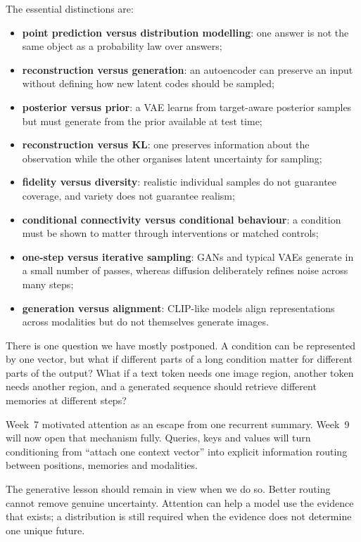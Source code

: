 The essential distinctions are:
\begin{itemize}[leftmargin=*]
  \item \textbf{point prediction versus distribution modelling}: one answer is not the same object as a probability law over answers;
  \item \textbf{reconstruction versus generation}: an autoencoder can preserve an input without defining how new latent codes should be sampled;
  \item \textbf{posterior versus prior}: a VAE learns from target-aware posterior samples but must generate from the prior available at test time;
  \item \textbf{reconstruction versus KL}: one preserves information about the observation while the other organises latent uncertainty for sampling;
  \item \textbf{fidelity versus diversity}: realistic individual samples do not guarantee coverage, and variety does not guarantee realism;
  \item \textbf{conditional connectivity versus conditional behaviour}: a condition must be shown to matter through interventions or matched controls;
  \item \textbf{one-step versus iterative sampling}: GANs and typical VAEs generate in a small number of passes, whereas diffusion deliberately refines noise across many steps;
  \item \textbf{generation versus alignment}: CLIP-like models align representations across modalities but do not themselves generate images.
\end{itemize}

There is one question we have mostly postponed. A condition can be represented by one vector, but what if different parts of a long condition matter for different parts of the output? What if a text token needs one image region, another token needs another region, and a generated sequence should retrieve different memories at different steps?

Week~7 motivated attention as an escape from one recurrent summary. Week~9 will now open that mechanism fully. Queries, keys and values will turn conditioning from ``attach one context vector'' into explicit information routing between positions, memories and modalities.

The generative lesson should remain in view when we do so. Better routing cannot remove genuine uncertainty. Attention can help a model use the evidence that exists; a distribution is still required when the evidence does not determine one unique future.
